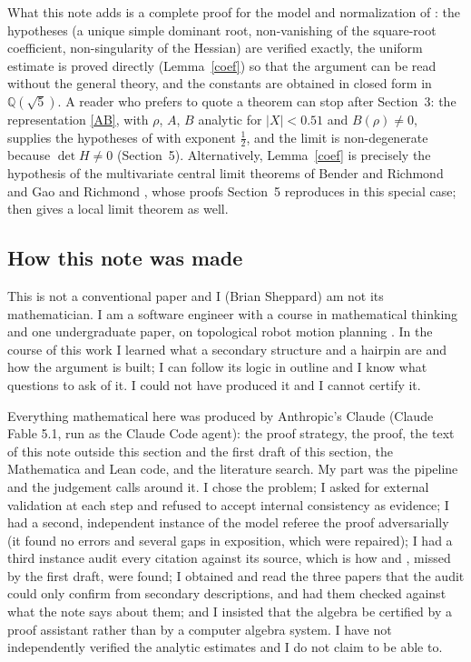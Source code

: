 \documentclass[11pt]{amsart}
\theoremstyle{remark}
\begin{document}
What this note adds is a complete proof for the model and normalization of \cite{BKZ}: the hypotheses (a unique simple
dominant root, non-vanishing of the square-root coefficient, non-singularity of the Hessian) are verified exactly,
the uniform estimate is proved directly (Lemma~\ref{coef}) so that the argument can be read without the general
theory, and the constants are obtained in closed form in $\mathbb Q(\sqrt5)$. A reader who prefers to quote a theorem
can stop after Section~3: the representation \eqref{AB}, with $\rho$, $A$, $B$ analytic for $|X|<0.51$ and
$B(\rho)\neq0$, supplies the hypotheses of \cite[Thm.~2.25]{D} with exponent $\tfrac12$, and the limit is
non-degenerate because $\det H\neq0$ (Section~5). Alternatively, Lemma~\ref{coef} is precisely the hypothesis of
the multivariate central limit theorems of Bender and Richmond \cite[Thm.~1]{BR} and Gao and Richmond
\cite[Thm.~2]{GR}, whose proofs Section~5 reproduces in this special case; \cite[Thm.~4]{GR} then gives a local
limit theorem as well.

\subsection*{How this note was made}
This is not a conventional paper and I (Brian Sheppard) am not its mathematician. I am a software engineer with a course
in mathematical thinking and one undergraduate paper, on topological robot motion planning \cite{JSZ}. In the course of this work I learned what a secondary structure and a
hairpin are and how the argument is built; I can follow its logic in outline and I know what questions to ask of
it. I could not have produced it and I cannot certify it.

Everything mathematical here was produced by Anthropic's Claude (Claude Fable 5.1, run as the Claude Code agent):
the proof strategy, the proof, the text of this note outside this section and the first draft of this section,
the Mathematica and Lean code, and the literature search. My part was the
pipeline and the judgement calls around it. I chose the problem; I asked for external validation at each step and
refused to accept internal consistency as evidence; I had a second, independent instance of the model referee the
proof adversarially (it found no errors and several gaps in exposition, which were repaired); I had a third instance
audit every citation against its source, which is how \cite{CM} and \cite{JR}, missed by the first draft, were found;
I obtained and read the three papers that the audit could only confirm from secondary descriptions, and had them
checked against what the note says about them; and I insisted that the algebra be certified by a proof assistant
rather than by a computer algebra system. I have not independently verified the analytic estimates and I do not
claim to be able to.
\end{document}
